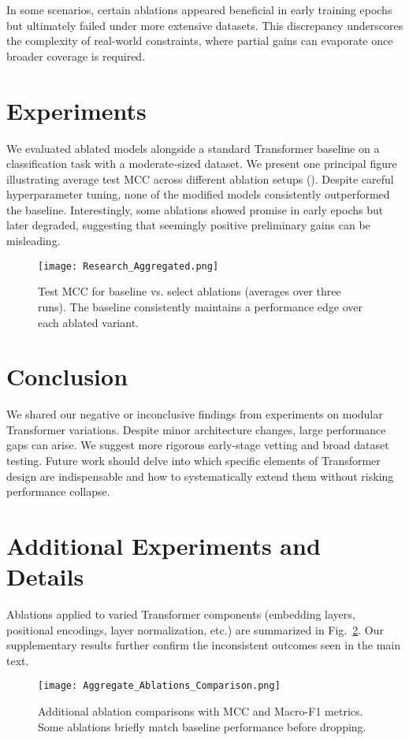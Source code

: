 \documentclass{article}
\begin{document}
In some scenarios, certain ablations appeared beneficial in early training epochs but ultimately failed under more extensive datasets. This discrepancy underscores the complexity of real-world constraints, where partial gains can evaporate once broader coverage is required.

\section{Experiments}
We evaluated ablated models alongside a standard Transformer baseline on a classification task with a moderate-sized dataset. We present one principal figure illustrating average test MCC across different ablation setups (). Despite careful hyperparameter tuning, none of the modified models consistently outperformed the baseline. Interestingly, some ablations showed promise in early epochs but later degraded, suggesting that seemingly positive preliminary gains can be misleading.

\begin{figure}[t]
    \centering
    \texttt{[image: Research\_Aggregated.png]}
    \caption{Test MCC for baseline vs. select ablations (averages over three runs). The baseline consistently maintains a performance edge over each ablated variant.}
    \label{fig:ablation_results}
\end{figure}

\section{Conclusion}
We shared our negative or inconclusive findings from experiments on modular Transformer variations. Despite minor architecture changes, large performance gaps can arise. We suggest more rigorous early-stage vetting and broad dataset testing. Future work should delve into which specific elements of Transformer design are indispensable and how to systematically extend them without risking performance collapse.

{\small


}

\clearpage
\appendix
\section{Additional Experiments and Details}
Ablations applied to varied Transformer components (embedding layers, positional encodings, layer normalization, etc.) are summarized in Fig.~\ref{fig:allAblations}. Our supplementary results further confirm the inconsistent outcomes seen in the main text.

\begin{figure}[h]
    \centering
    \texttt{[image: Aggregate\_Ablations\_Comparison.png]}
    \caption{Additional ablation comparisons with MCC and Macro-F1 metrics. Some ablations briefly match baseline performance before dropping.}
    \label{fig:allAblations}
\end{figure}
\end{document}
